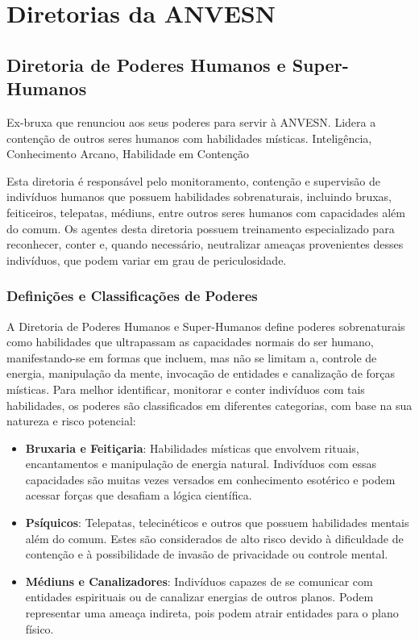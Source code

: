\part{Diretorias da ANVESN}

\chapter{Diretoria de Poderes Humanos e Super-Humanos}




{Ex-bruxa que renunciou aos seus poderes para servir à ANVESN. Lidera a contenção de outros seres humanos com habilidades místicas.}
{Inteligência, Conhecimento Arcano, Habilidade em Contenção}



Esta diretoria é responsável pelo monitoramento, contenção e supervisão de indivíduos humanos que possuem habilidades sobrenaturais, incluindo bruxas, feiticeiros, telepatas, médiuns, entre outros seres humanos com capacidades além do comum. Os agentes desta diretoria possuem treinamento especializado para reconhecer, conter e, quando necessário, neutralizar ameaças provenientes desses indivíduos, que podem variar em grau de periculosidade.

\section{Definições e Classificações de Poderes}
A Diretoria de Poderes Humanos e Super-Humanos define poderes sobrenaturais como habilidades que ultrapassam as capacidades normais do ser humano, manifestando-se em formas que incluem, mas não se limitam a, controle de energia, manipulação da mente, invocação de entidades e canalização de forças místicas. Para melhor identificar, monitorar e conter indivíduos com tais habilidades, os poderes são classificados em diferentes categorias, com base na sua natureza e risco potencial:

\begin{itemize}
    \item \textbf{Bruxaria e Feitiçaria}: Habilidades místicas que envolvem rituais, encantamentos e manipulação de energia natural. Indivíduos com essas capacidades são muitas vezes versados em conhecimento esotérico e podem acessar forças que desafiam a lógica científica.
    \item \textbf{Psíquicos}: Telepatas, telecinéticos e outros que possuem habilidades mentais além do comum. Estes são considerados de alto risco devido à dificuldade de contenção e à possibilidade de invasão de privacidade ou controle mental.
    \item \textbf{Médiuns e Canalizadores}: Indivíduos capazes de se comunicar com entidades espirituais ou de canalizar energias de outros planos. Podem representar uma ameaça indireta, pois podem atrair entidades para o plano físico.
\end{itemize}

